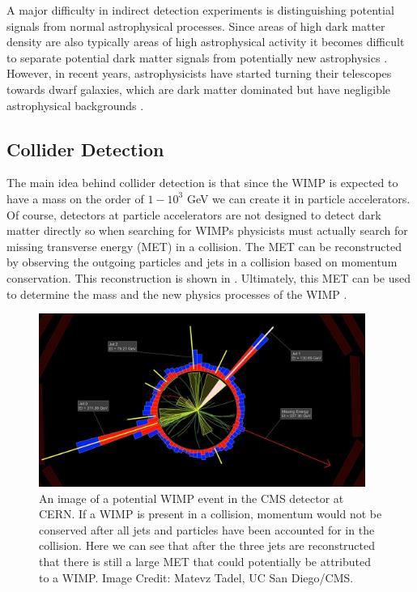 A major difficulty in indirect detection experiments is distinguishing potential signals from normal astrophysical processes.  Since areas of high dark matter density are also typically areas of high astrophysical activity it becomes difficult to separate potential dark matter signals from potentially new astrophysics \cite{zitzer2015search}.  However, in recent years, astrophysicists have started turning their telescopes towards dwarf galaxies, which are dark matter dominated but have negligible astrophysical backgrounds \cite{conrad2014indirect}.  %



\subsection{Collider Detection}

The main idea behind collider detection is that since the WIMP is expected to have a mass on the order of $1-10^3$ GeV we can create it in particle accelerators.  Of course, detectors at particle accelerators are not designed to detect dark matter directly so when searching for WIMPs physicists must actually search for missing transverse energy (MET) in a collision.  The MET can be reconstructed by observing the outgoing particles and jets in a collision based on momentum conservation.  This reconstruction is shown in .  Ultimately, this MET can be used to determine the mass and the new physics processes of the WIMP \cite{bi2013status}.

\begin{figure}[b]
	\centering
	\includegraphics[width=0.95\textwidth]{collider_detection_cms}
	\caption{An image of a potential WIMP event in the CMS detector at CERN.  If a WIMP is present in a collision, momentum would not be conserved after all jets and particles have been accounted for in the collision.  Here we can see that after the three jets are reconstructed that there is still a large MET that could potentially be attributed to a WIMP.  Image Credit: Matevz Tadel, UC San Diego/CMS.}
	\label{fig:collider_detection}
\end{figure}

